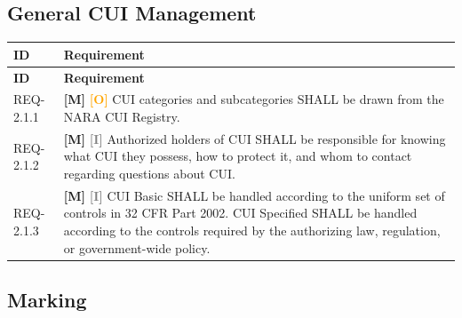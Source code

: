 \documentclass[11pt,letterpaper]{article}
\begin{document}
\subsection{General CUI Management}

\begin{longtable}{@{}p{1.4cm}p{11.6cm}@{}}
\toprule
\textbf{ID} & \textbf{Requirement} \\
\midrule
\endfirsthead
\toprule
\textbf{ID} & \textbf{Requirement} \\
\midrule
\endhead

REQ-2.1.1 & \textcolor{mandatory}{\textbf{[M]}} \textcolor{orange}{\textbf{[O]}} CUI categories and subcategories SHALL be drawn from the NARA CUI Registry. \\[6pt]

REQ-2.1.2 & \textcolor{mandatory}{\textbf{[M]}} \textcolor{gray}{\textbf{[I]}} Authorized holders of CUI SHALL be responsible for knowing what CUI they possess, how to protect it, and whom to contact regarding questions about CUI. \\[6pt]

REQ-2.1.3 & \textcolor{mandatory}{\textbf{[M]}} \textcolor{gray}{\textbf{[I]}} CUI Basic SHALL be handled according to the uniform set of controls in 32 CFR Part 2002. CUI Specified SHALL be handled according to the controls required by the authorizing law, regulation, or government-wide policy. \\[6pt]

\bottomrule
\end{longtable}

\subsection{Marking}
\end{document}
